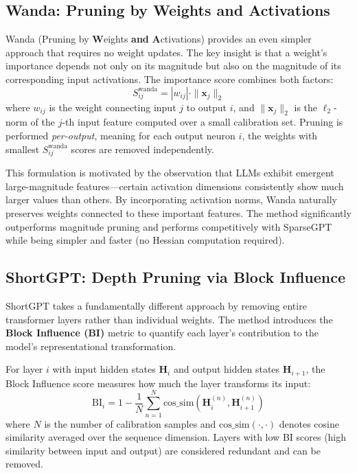 \documentclass{article}
\begin{document}
\subsection{Wanda: Pruning by Weights and Activations}

Wanda (Pruning by \textbf{W}eights \textbf{and} \textbf{A}ctivations) \cite{sun2024wanda} provides an even simpler approach that requires no weight updates. The key insight is that a weight's importance depends not only on its magnitude but also on the magnitude of its corresponding input activations. The importance score combines both factors:
\begin{equation}
    S_{ij}^{\text{wanda}} = |w_{ij}| \cdot \|\mathbf{x}_j\|_2
\end{equation}
where $w_{ij}$ is the weight connecting input $j$ to output $i$, and $\|\mathbf{x}_j\|_2$ is the $\ell_2$-norm of the $j$-th input feature computed over a small calibration set. Pruning is performed \emph{per-output}, meaning for each output neuron $i$, the weights with smallest $S_{ij}^{\text{wanda}}$ scores are removed independently.

This formulation is motivated by the observation that LLMs exhibit emergent large-magnitude features---certain activation dimensions consistently show much larger values than others. By incorporating activation norms, Wanda naturally preserves weights connected to these important features. The method significantly outperforms magnitude pruning and performs competitively with SparseGPT while being simpler and faster (no Hessian computation required).

\subsection{ShortGPT: Depth Pruning via Block Influence}

ShortGPT \cite{men2024shortgpt} takes a fundamentally different approach by removing entire transformer layers rather than individual weights. The method introduces the \textbf{Block Influence (BI)} metric to quantify each layer's contribution to the model's representational transformation.

For layer $i$ with input hidden states $\mathbf{H}_i$ and output hidden states $\mathbf{H}_{i+1}$, the Block Influence score measures how much the layer transforms its input:
\begin{equation}
    \text{BI}_i = 1 - \frac{1}{N}\sum_{n=1}^{N} \text{cos\_sim}(\mathbf{H}_i^{(n)}, \mathbf{H}_{i+1}^{(n)})
    \label{eq:shortgpt}
\end{equation}
where $N$ is the number of calibration samples and $\text{cos\_sim}(\cdot,\cdot)$ denotes cosine similarity averaged over the sequence dimension. Layers with low BI scores (high similarity between input and output) are considered redundant and can be removed.
\end{document}
